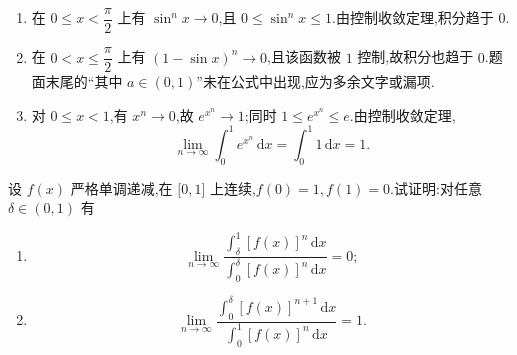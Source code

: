 \begin{solution}
    \leavevmode
    \begin{enumerate}
        \item 在 $0\leq x<\dfrac{\pi}{2}$ 上有 $\sin^n x\to0$,且 $0\leq\sin^n x\leq1$.由控制收敛定理,积分趋于 $0$.

        \item 在 $0<x\leq\dfrac{\pi}{2}$ 上有 $(1-\sin x)^n\to0$,且该函数被 $1$ 控制,故积分也趋于 $0$.题面末尾的``其中 $a\in(0,1)$''未在公式中出现,应为多余文字或漏项.

        \item 对 $0\leq x<1$,有 $x^n\to0$,故 $e^{x^n}\to1$;同时 $1\leq e^{x^n}\leq e$.由控制收敛定理,
              \[
                  \displaystyle\lim\limits_{n\to\infty}\int_0^1e^{x^n}\,\mathrm{d}x
                  =\int_0^1 1\,\mathrm{d}x=1.
              \]
    \end{enumerate}
\end{solution}

\begin{example}
    设 $f(x)$ 严格单调递减,在 $\lbrack 0,1\rbrack$ 上连续,$f(0)=1,f(1)=0$.试证明:对任意 $\delta\in(0,1)$ 有
    \begin{enumerate}
        \item
              \[
                  \displaystyle\lim\limits_{n\to\infty}
                  \dfrac{\displaystyle\int_\delta^1[f(x)]^n\,\mathrm{d}x}
                  {\displaystyle\int_0^\delta[f(x)]^n\,\mathrm{d}x}=0;
              \]
        \item
              \[
                  \displaystyle\lim\limits_{n\to\infty}
                  \dfrac{\displaystyle\int_0^\delta[f(x)]^{n+1}\,\mathrm{d}x}
                  {\displaystyle\int_0^1[f(x)]^n\,\mathrm{d}x}=1.
              \]
    \end{enumerate}
\end{example}
\exampleblank

